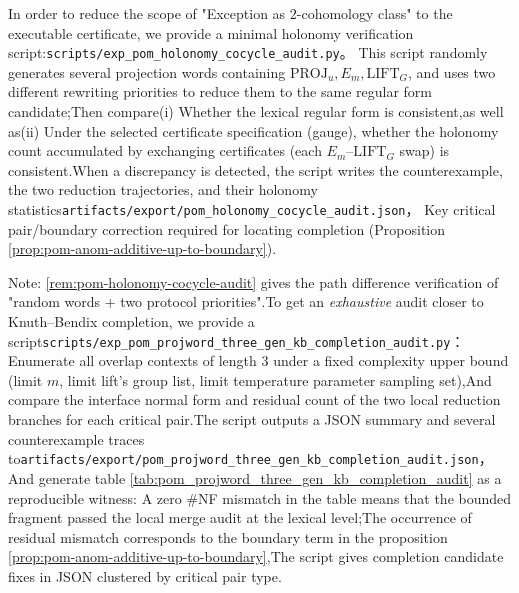 \begin{remark}\label{rem:pom-holonomy-cocycle-audit}In order to reduce the scope of "Exception as \(2\)-cohomology class" to the executable certificate, we provide a minimal holonomy verification script:\texttt{scripts/exp\_pom\_holonomy\_cocycle\_audit.py}。
This script randomly generates several projection words containing \(\mathrm{PROJ}_u,E_m,\mathrm{LIFT}_G\), and uses two different rewriting priorities to reduce them to the same regular form candidate;Then compare(i) Whether the lexical regular form is consistent,as well as(ii) Under the selected certificate specification (gauge), whether the holonomy count accumulated by exchanging certificates (each \(E_m\)--\(\mathrm{LIFT}_G\) swap) is consistent.When a discrepancy is detected, the script writes the counterexample, the two reduction trajectories, and their holonomy statistics\texttt{artifacts/export/pom\_holonomy\_cocycle\_audit.json}，
Key critical pair/boundary correction required for locating completion (Proposition \ref{prop:pom-anom-additive-up-to-boundary}).\end{remark}

\begin{remark}\label{rem:pom-threegen-kb-completion-audit}Note: \ref{rem:pom-holonomy-cocycle-audit} gives the path difference verification of "random words + two protocol priorities".To get an \emph{exhaustive} audit closer to Knuth--Bendix completion, we provide a script\texttt{scripts/exp\_pom\_projword\_three\_gen\_kb\_completion\_audit.py}：
Enumerate all overlap contexts of length \(3\) under a fixed complexity upper bound (limit \(m\), limit lift's group list, limit temperature parameter sampling set),And compare the interface normal form and residual count of the two local reduction branches for each critical pair.The script outputs a JSON summary and several counterexample traces to\texttt{artifacts/export/pom\_projword\_three\_gen\_kb\_completion\_audit.json}，
And generate table \ref{tab:pom_projword_three_gen_kb_completion_audit} as a reproducible witness:
A zero \(\#\)NF mismatch in the \noindent table means that the bounded fragment passed the local merge audit at the lexical level;The occurrence of residual mismatch corresponds to the boundary term in the proposition \ref{prop:pom-anom-additive-up-to-boundary},The script gives completion candidate fixes in JSON clustered by critical pair type.\end{remark}

